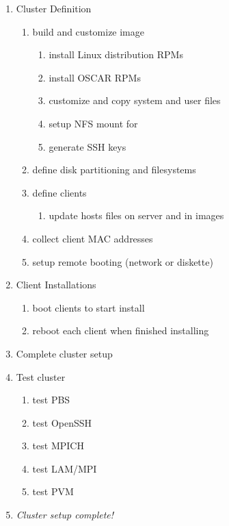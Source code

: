 \begin{enumerate}
\item Cluster Definition
  \begin{enumerate}
  \item build and customize image
    \begin{enumerate}
    \item install Linux distribution RPMs
    \item install OSCAR RPMs
    \item customize and copy system and user files
    \item setup NFS mount for 
    \item generate SSH keys
    \end{enumerate}
  \item define disk partitioning and filesystems
  \item define clients
    \begin{enumerate}
    \item update hosts files on server and in images
    \end{enumerate}
  \item collect client MAC addresses
  \item setup remote booting (network or diskette)
  \end{enumerate}
  
\item Client Installations
  \begin{enumerate}
  \item boot clients to start install
  \item reboot each client when finished installing
  \end{enumerate}
\item Complete cluster setup
\item Test cluster
  \begin{enumerate}
  \item test PBS
  \item test OpenSSH
  \item test MPICH
  \item test LAM/MPI
  \item test PVM
  \end{enumerate}
\item \emph{Cluster setup complete!}
\end{enumerate}

